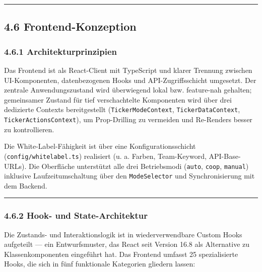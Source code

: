 \begin{center}\rule{0.5\linewidth}{0.5pt}\end{center}

\subsection{4.6 Frontend-Konzeption}\label{frontend-konzeption}

\subsubsection{4.6.1 Architekturprinzipien}\label{architekturprinzipien}

Das Frontend ist als React-Client mit TypeScript und klarer Trennung
zwischen UI-Komponenten, datenbezogenen Hooks und API-Zugriffsschicht
umgesetzt. Der zentrale Anwendungszustand wird überwiegend lokal bzw.
feature-nah gehalten; gemeinsamer Zustand für tief verschachtelte
Komponenten wird über drei dedizierte Contexts bereitgestellt
(\passthrough{\lstinline!TickerModeContext!},
\passthrough{\lstinline!TickerDataContext!},
\passthrough{\lstinline!TickerActionsContext!}), um Prop-Drilling zu
vermeiden und Re-Renders besser zu kontrollieren.

Die White-Label-Fähigkeit ist über eine Konfigurationsschicht
(\passthrough{\lstinline!config/whitelabel.ts!}) realisiert (u. a.
Farben, Team-Keyword, API-Base-URLs). Die Oberfläche unterstützt alle
drei Betriebsmodi (\passthrough{\lstinline!auto!},
\passthrough{\lstinline!coop!}, \passthrough{\lstinline!manual!})
inklusive Laufzeitumschaltung über den
\passthrough{\lstinline!ModeSelector!} und Synchronisierung mit dem
Backend.

\begin{center}\rule{0.5\linewidth}{0.5pt}\end{center}

\subsubsection{4.6.2 Hook- und
State-Architektur}\label{hook--und-state-architektur}

Die Zustands- und Interaktionslogik ist in wiederverwendbare Custom
Hooks aufgeteilt --- ein Entwurfsmuster, das React seit Version 16.8 als
Alternative zu Klassenkomponenten eingeführt hat. Das Frontend umfasst
25 spezialisierte Hooks, die sich in fünf funktionale Kategorien
gliedern lassen:

